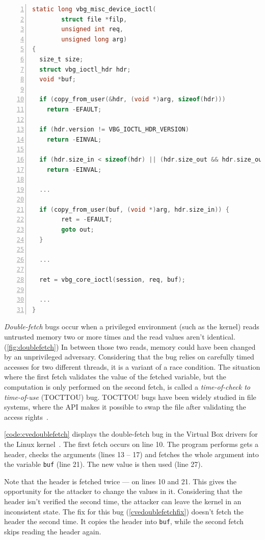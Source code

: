 \begin{lstlisting}[language=C, caption=Abridged CVE-2018-12633 Double Fetch in Linux,
                  label=code:cvedoublefetch,  breaklines=true
                  postbreak=\mbox{\textcolor{red}{$\hookrightarrow$}\space},
                  numbers=left,basicstyle=\scriptsize]
static long vbg_misc_device_ioctl(
        struct file *filp,
        unsigned int req,
        unsigned long arg)
{
  size_t size;
  struct vbg_ioctl_hdr hdr;
  void *buf;

  if (copy_from_user(&hdr, (void *)arg, sizeof(hdr))) 
    return -EFAULT;
  
  if (hdr.version != VBG_IOCTL_HDR_VERSION) 
    return -EINVAL;
   
  if (hdr.size_in < sizeof(hdr) || (hdr.size_out && hdr.size_out < sizeof(hdr)))
    return -EINVAL;
  
  ...
  
  if (copy_from_user(buf, (void *)arg, hdr.size_in)) {
		ret = -EFAULT;
		goto out;
  }

  ...

  ret = vbg_core_ioctl(session, req, buf);

  ...
}
\end{lstlisting}
\emph{Double-fetch} bugs occur when a privileged environment (such as the
kernel) reads untrusted memory two or more times and the read values aren't
identical. (\autoref{fig:doublefetch}) In between those two reads, memory could
have been changed by an unprivileged adversary. Considering that the bug relies
on carefully timed accesses for two different threads, it is a variant of a race
condition. The situation where the first fetch validates the value of the
fetched variable, but the computation is only performed on the second fetch, is
called a \emph{time-of-check to time-of-use} (TOCTTOU) bug. TOCTTOU bugs have
been widely studied in file systems, where the API makes it possible to swap the
file after validating the access rights~\cite{payer2012protecting,
pu2006methodical, wei2010modeling, tsafrir2008portably}.

\autoref{code:cvedoublefetch} displays the double-fetch bug in the Virtual Box
drivers for the Linux kernel~\cite{cve201812633}. The first fetch occurs on line
10. The program performs gets a header, checks the arguments (lines 13 -- 17)
and fetches the whole argument into the variable \texttt{buf} (line 21). The new
value is then used (line 27).

Note that the header is fetched twice --- on lines 10 and 21. This gives the
opportunity for the attacker to change the values in it. Considering
that the header isn't verified the second time, the attacker can
leave the kernel in an inconsistent state. The fix for this bug
(\autoref{cvedoublefetchfix}) doesn't fetch the header the second time. It
copies the header into \texttt{buf}, while the second fetch skips reading the header
again.

